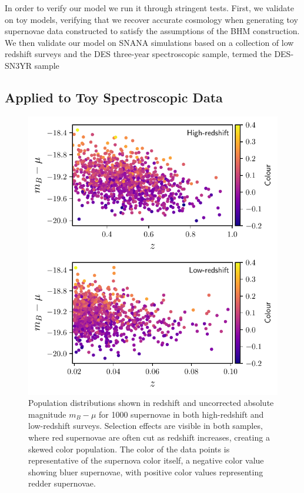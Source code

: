 \documentclass[a4paper,fleqn,usenatbib,manuscript]{emulateapj}
\begin{document}
In order to verify our model we run it through stringent tests. First, we validate on toy models, verifying that we recover accurate cosmology when generating toy supernovae data constructed to satisfy the assumptions of the BHM construction. We then validate our model on SNANA simulations based on a collection of low redshift surveys and the DES three-year spectroscopic sample, termed the DES-SN3YR sample

\subsection{Applied to Toy Spectroscopic Data}
\label{sec:toy}


\begin{figure}
	\begin{center}
		\includegraphics[width=\columnwidth]{plot_pop_simple.pdf}
	\end{center}
	\caption{Population distributions shown in redshift and uncorrected absolute magnitude $m_B - \mu$ for 1000 supernovae in both high-redshift and low-redshift surveys. Selection effects are visible in both samples, where red supernovae are often cut as redshift increases, creating a skewed color population. The color of the data points is representative of the supernova color itself, a negative color value showing bluer supernovae, with positive color values representing redder supernovae.}
	\label{fig:simple_pop}
\end{figure}
\end{document}
